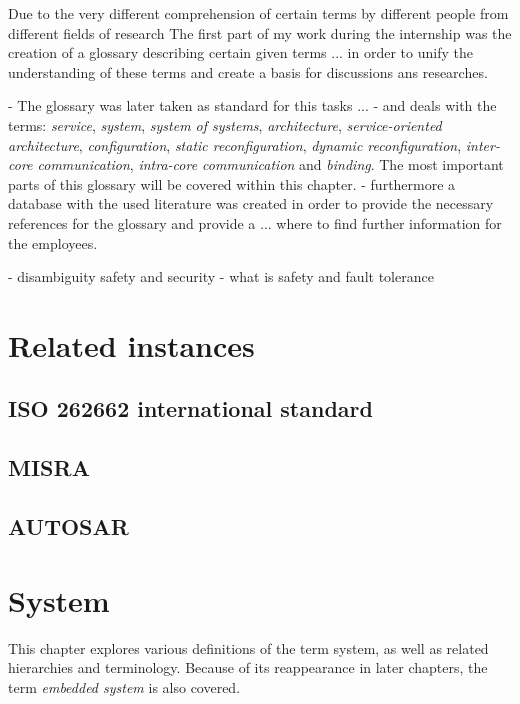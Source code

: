 Due to the very different comprehension of certain terms by different people from different fields of research 
The first part of my work during the internship was the creation of a glossary describing certain given terms
... in order to unify the understanding of these terms and create a basis for discussions ans researches.

- The glossary was later taken as standard for this tasks ...
- and deals with the terms: \emph{service}, \emph{system}, \emph{system of systems}, \emph{architecture}, \emph{service-oriented architecture}, \emph{configuration}, \emph{static reconfiguration}, \emph{dynamic reconfiguration}, \emph{inter-core communication}, \emph{intra-core communication} and \emph{binding}.
The most important parts of this glossary will be covered within this chapter.
- furthermore a database with the used literature was created in order to provide the necessary references for the glossary and provide a ... where to find further information for the employees. 

- disambiguity safety and security
- what is safety and fault tolerance

\section{Related instances}
\subsection{ISO 262662 international standard}
\subsection{MISRA}
\subsection{AUTOSAR}




\section{System}

\label{ch:system}
This chapter explores various definitions of the term system, as well as related hierarchies and terminology. Because of its reappearance in later chapters, the term \emph{embedded system} is also covered.


